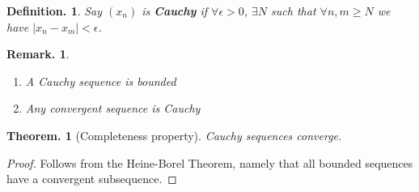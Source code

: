 \documentclass[11pt, a4paper]{memoir}
\theoremstyle{change}
\newtheorem{theorem}{Theorem.}[section]
\theoremstyle{plain}
\theoremstyle{nonumberplain}
\newtheorem{definition}{Definition.}
\newtheorem{remark}{Remark.}
\newtheorem{proof}{Proof}
\numberwithin{equation}{section}
\begin{document}
\begin{definition}
    Say $(x_n)$ is \textbf{Cauchy} if $\forall\epsilon>0$, $\exists N$ such that $\forall n,m\geq N$ we have
    $|x_n-x_m|<\epsilon$.
\end{definition}
\begin{remark}\hspace{1cm}
    \begin{enumerate}
        \item A Cauchy sequence is bounded
        \item Any convergent sequence is Cauchy
    \end{enumerate}
\end{remark}
\begin{theorem}[Completeness property]
    Cauchy sequences converge.
\end{theorem}
\begin{proof}
    Follows from the Heine-Borel Theorem, namely that all bounded sequences have a convergent subsequence.
\end{proof}
\end{document}
